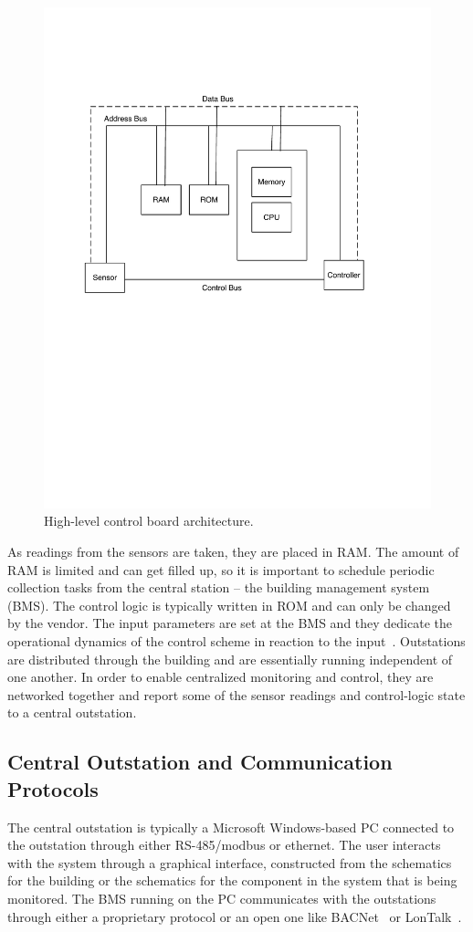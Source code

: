 \begin{figure}[t!] %
\centering
\includegraphics[width=0.50\columnwidth]{figs/control_box}
\caption{High-level control board architecture.}
\label{fig:control_box}
\end{figure}

As readings from the sensors are taken, they are placed in RAM.  The amount of RAM is limited and can get filled up, so it is important
to schedule periodic collection tasks from the central station -- the building management system (BMS).  The control logic is typically
written in ROM and can only be changed by the vendor.  The input parameters are set at the BMS and they dedicate the operational dynamics
of the control scheme in reaction to the input~\cite{BMS_book}.
Outstations are distributed through the building and are essentially running independent of one another.  In order to enable centralized 
monitoring and control, they are networked together and report some of the sensor readings and control-logic state to a central outstation.

\subsection{Central Outstation and Communication Protocols}
The central outstation is typically a Microsoft Windows-based PC connected to the outstation through either RS-485/modbus or ethernet.
The user interacts with the system through a graphical interface, constructed from the schematics for the building or the schematics
for the component in the system that is being monitored.  The BMS running on the PC communicates with the outstations through either a 
proprietary protocol or an open one like BACNet~\cite{Bacnet} or LonTalk~\cite{LonTalk}.

